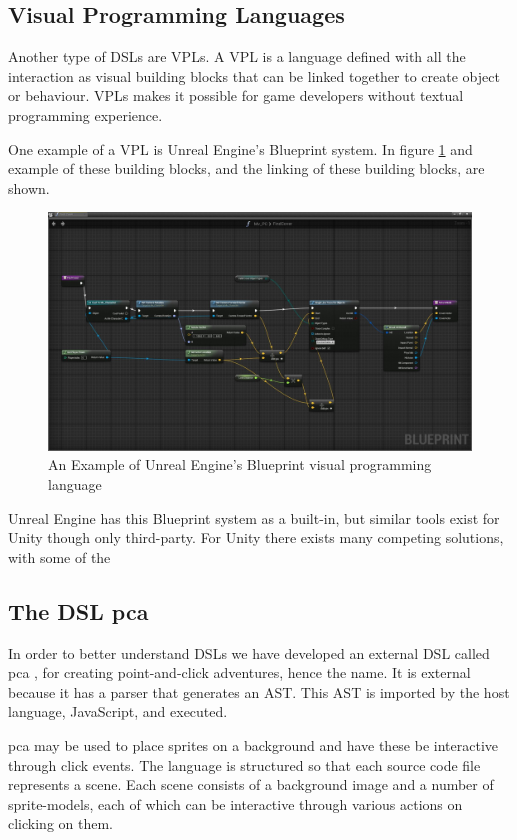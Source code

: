 \subsection{Visual Programming Languages}
Another type of \acp{DSL} are \acp{VPL}. A \ac{VPL} is a language defined with all the interaction as visual building blocks that can be linked together to create object or behaviour. \acp{VPL} makes it possible for game developers without textual programming experience.

One example of a \ac{VPL} is Unreal Engine's Blueprint system. In figure \ref{fig:unreal:blueprint} and example of these building blocks, and the linking of these building blocks, are shown.

\begin{figure}[H]
    \centering
    \includegraphics[width=\textwidth]{images/unreal_blueprint.jpg}
    \caption{An Example of Unreal Engine's Blueprint visual programming language}
    \label{fig:unreal:blueprint}
\end{figure}

Unreal Engine has this Blueprint system as a built-in, but similar tools exist for Unity though only third-party. For Unity there exists many competing solutions, with some of the 


\subsection{The DSL pca} \label{sec:animools}
In order to better understand \acp{DSL} we have developed an external \ac{DSL} called pca \cite{github:pca}, for creating point-and-click adventures, hence the name. It is external because it has a parser that generates an \ac{AST}. This \ac{AST} is imported by the host language, JavaScript, and executed.

pca may be used to place sprites on a background and have these be interactive through click events. The language is structured so that each source code file represents a scene.
Each scene consists of a background image and a number of sprite-models, each of which can be interactive through various actions on clicking on them. 

